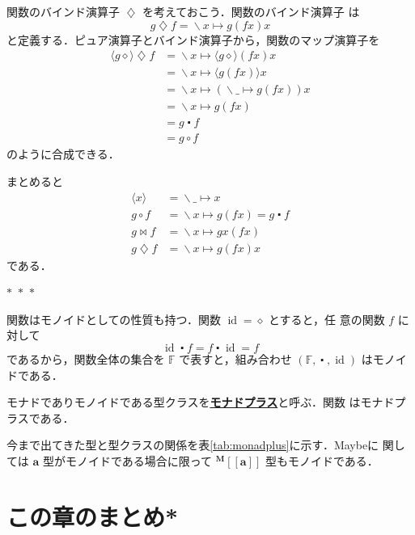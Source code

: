 \documentclass[a5paper,twoside,fleqn,draft]{jsbook}
\def\[{[\![}
\def\]{]\!]}
\newcommand{\separator}{\begin{center}$*$~$*$~$*$\end{center}}
\newcommand{\keyword}[1]{{\underline{\textbf{#1}}}}
\newcommand{\mAnonParam}{\diamond}
\newcommand{\mSpecialFunc}[1]{#1}
\DeclareMathOperator{\mId}{\mSpecialFunc{id}}
\DeclareMathOperator{\mAppMapFunc}{\bowtie}
\DeclareMathOperator{\mBindFunc}{\diamondsuit}
\DeclareMathOperator{\mComp}{\centerdot}
\DeclareMathOperator{\mLambda}{\backslash}
\DeclareMathOperator{\mLambdaArrow}{\mapsto}
\DeclareMathOperator{\mMapFunc}{\circ}
\newcommand{\mSpecialSet}[1]{\mathbb{#1}}
\newcommand{\mFSet}{\mSpecialSet{F}}
\newcommand{\mType}[1]{\mathbf{#1}} %
\newcommand{\mA}{\mType{a}}
\newcommand{\mTypeAssemble}[2]{{}^\mType{#1}\[\mType{#2}\]}
\newcommand{\mMaybeType}[1]{\mTypeAssemble{M}{#1}}
\newcommand{\mFuncWith}[1]{\langle#1\rangle}  %
\newcommand{\mLambdaEXP}[2]{\mLambda{#1}\mLambdaArrow{#2}} %
\begin{document}
関数のバインド演算子 $\mBindFunc$ を考えておこう．関数のバインド演算子
は
\begin{equation}
g\mBindFunc f=\mLambdaEXP{x}{g(fx)x}
\end{equation}
と定義する．ピュア演算子とバインド演算子から，関数のマップ演算子を
\begin{align}
\mFuncWith{g\mAnonParam}\mBindFunc f
&=\mLambdaEXP{x}{\mFuncWith{g\mAnonParam}(fx)x}\\
&=\mLambdaEXP{x}{\mFuncWith{g(fx)}x}\\
&=\mLambdaEXP{x}{(\mLambdaEXP{\_}{g(fx)})x}\\
&=\mLambdaEXP{x}{g(fx)}\\
&=g\mComp f\\
&=g\mMapFunc f
\end{align}
のように合成できる．

まとめると
\begin{align}
\mFuncWith{x}&=\mLambdaEXP{\_}{x}\\
g\mMapFunc f&=\mLambdaEXP{x}{g(fx)}=g\mComp f\\
g\mAppMapFunc f&=\mLambdaEXP{x}{gx(fx)}\\
g\mBindFunc f&=\mLambdaEXP{x}{g(fx)x}
\end{align}
である．


\separator

関数はモノイドとしての性質も持つ．関数 $\mId=\mAnonParam$ とすると，任
意の関数 $f$ に対して
\begin{equation}
\mId\mComp f=f\mComp\mId=f
\end{equation}
であるから，関数全体の集合を $\mFSet$ で表すと，組み合わせ
$(\mFSet,\mComp,\mId)$ はモノイドである．

モナドでありモノイドである型クラスを\keyword{モナドプラス}と呼ぶ．関数
はモナドプラスである．

今まで出てきた型と型クラスの関係を表\ref{tab:monadplus}に示す．Maybeに
関しては $\mA $ 型がモノイドである場合に限って $\mMaybeType{a}$
型もモノイドである．

\section{この章のまとめ*}
\end{document}
